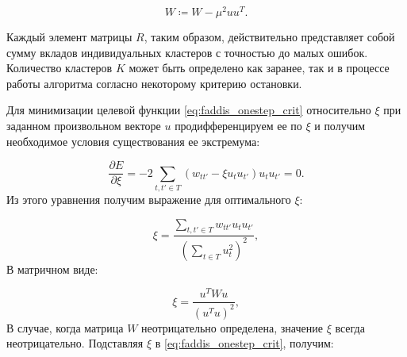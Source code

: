 \documentclass[12pt]{article}
\begin{document}
\begin{equation}
	W  \coloneqq W - \mu^2uu^T.
\end{equation}

Каждый элемент матрицы $R$, таким образом, действительно представляет собой сумму вкладов индивидуальных кластеров с точностью до малых ошибок. Количество кластеров $K$ может быть определено как заранее, так и в процессе работы алгоритма согласно некоторому критерию остановки.

Для минимизации целевой функции \eqref{eq:faddis_onestep_crit} относительно $\xi$ при заданном произвольном векторе $u$ продифференцируем ее по $\xi$ и получим необходимое условия существования ее экстремума:

\begin{equation}
	\frac{\partial E}{\partial \xi}= -2\sum_{t,t'\in T}(w_{tt'}-\xi u_t u_{t'}) u_t u_{t'} =0.
\end{equation}
Из этого уравнения получим выражение для оптимального $\xi$:

\begin{equation}
	\xi = \frac{\sum_{t,t'\in T}w_{tt'} u_t u_{t'}}{(\sum_{t \in T}u_t^2)^2},
\end{equation}
В матричном виде:

\begin{equation}
\xi = \frac{u^TWu}{(u^Tu)^2},
\end{equation}
В случае, когда матрица $W$ неотрицательно определена, значение $\xi$ всегда неотрицательно. Подставляя $\xi$ в \eqref{eq:faddis_onestep_crit}, получим:
\end{document}
